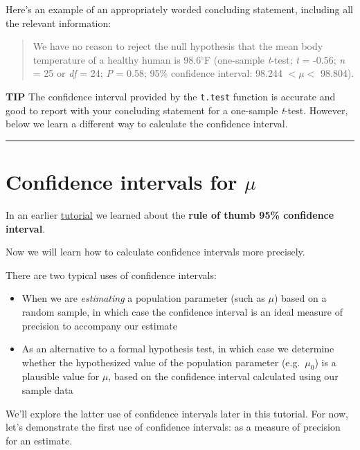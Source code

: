 \documentclass[
]{book}
\providecommand{\tightlist}{%
  \setlength{\itemsep}{0pt}\setlength{\parskip}{0pt}}
\begin{document}
Here's an example of an appropriately worded concluding statement, including all the relevant information:

\begin{quote}
We have no reason to reject the null hypothesis that the mean body temperature of a healthy human is 98.6\(^\circ\)F (one-sample \emph{t}-test; \emph{t} = -0.56; \emph{n} = 25 or \emph{df} = 24; \emph{P} = 0.58; 95\% confidence interval: 98.244 \(< \mu <\) 98.804).
\end{quote}

\textbf{TIP }
The confidence interval provided by the \texttt{t.test} function is accurate and good to report with your concluding statement for a one-sample \emph{t}-test. However, below we learn a different way to calculate the confidence interval.

\begin{center}\rule{0.5\linewidth}{0.5pt}\end{center}

\section{\texorpdfstring{Confidence intervals for \(\mu\)}{Confidence intervals for \textbackslash mu}}\label{t_confidence}

In an earlier \hyperref[confint_rough]{tutorial} we learned about the \textbf{rule of thumb 95\% confidence interval}.

Now we will learn how to calculate confidence intervals more precisely.

There are two typical uses of confidence intervals:

\begin{itemize}
\tightlist
\item
  When we are \emph{estimating} a population parameter (such as \(\mu\)) based on a random sample, in which case the confidence interval is an ideal measure of precision to accompany our estimate
\item
  As an alternative to a formal hypothesis test, in which case we determine whether the hypothesized value of the population parameter (e.g.~\(\mu_0\)) is a plausible value for \(\mu\), based on the confidence interval calculated using our sample data
\end{itemize}

We'll explore the latter use of confidence intervals later in this tutorial. For now, let's demonstrate the first use of confidence intervals: as a measure of precision for an estimate.
\end{document}
